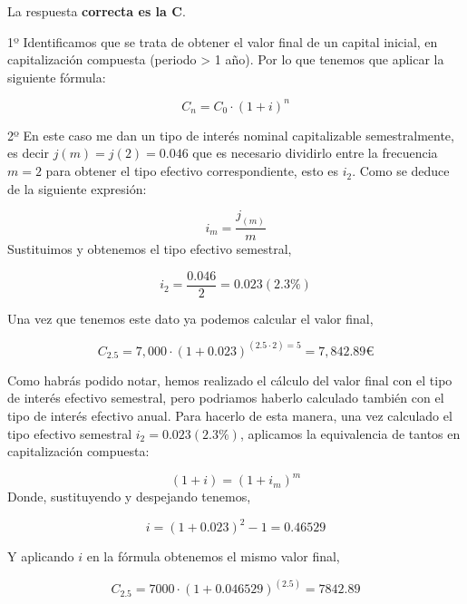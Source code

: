 \documentclass[
  letterpaper,
  DIV=11,
  numbers=noendperiod]{scrreprt}
\begin{document}
\begin{tcolorbox}[enhanced jigsaw, left=2mm, opacityback=0, colback=white, breakable, arc=.35mm, bottomrule=.15mm, rightrule=.15mm, toprule=.15mm, leftrule=.75mm, colframe=quarto-callout-tip-color-frame]
\begin{minipage}[t]{5.5mm}
\textcolor{quarto-callout-tip-color}{\faLightbulb}
\end{minipage}%
\begin{minipage}[t]{\textwidth - 5.5mm}

La respuesta \textbf{correcta es la C}.

1º Identificamos que se trata de obtener el valor final de un capital
inicial, en capitalización compuesta (periodo \textgreater{} 1 año). Por
lo que tenemos que aplicar la siguiente fórmula:

\[C_{ n }=C_{ 0 }\cdot { (1+i) }^{ n }\]

2º En este caso me dan un tipo de interés nominal capitalizable
semestralmente, es decir \(j(m) = j(2) = 0.046\) que es necesario
dividirlo entre la frecuencia \(m = 2\) para obtener el tipo efectivo
correspondiente, esto es \(i _2\). Como se deduce de la siguiente
expresión:

\[i_m=\frac{j _{(m)}}{m}\] Sustituimos y obtenemos el tipo efectivo
semestral,

\[i_2=\frac{0.046}{2}= 0.023 (2.3\%)\]

Una vez que tenemos este dato ya podemos calcular el valor final,

\[C_{ 2.5}=7,000\cdot { (1+0.023) }^{(2.5\cdot 2) = 5} = 7,842.89€\]

Como habrás podido notar, hemos realizado el cálculo del valor final con
el tipo de interés efectivo semestral, pero podriamos haberlo calculado
también con el tipo de interés efectivo anual. Para hacerlo de esta
manera, una vez calculado el tipo efectivo semestral
\(i_2=0.023 (2.3\%)\), aplicamos la equivalencia de tantos en
capitalización compuesta:

\[(1+i)=(1+ i _m)^m\] Donde, sustituyendo y despejando tenemos,

\[i=(1+ 0.023)^{2}-1= 0.46529\]

Y aplicando \(i\) en la fórmula obtenemos el mismo valor final,

\[C_{ 2.5}=7000\cdot { (1+0.046529) }^{(2.5)} = 7842.89\]

\end{minipage}%
\end{tcolorbox}
\end{document}
